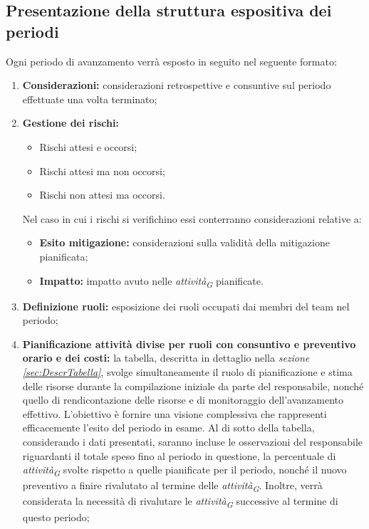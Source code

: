 \subsection{Presentazione della struttura espositiva dei periodi}
Ogni periodo di avanzamento verrà esposto in seguito nel seguente formato:
\begin{enumerate}
    \item \textbf{Considerazioni:} considerazioni retrospettive e consuntive sul periodo effettuate una volta terminato;

    \pagebreak
    
    \item \textbf{Gestione dei rischi:}
            \begin{itemize}
                \item Rischi attesi e occorsi;
                \item Rischi attesi ma non occorsi;
                \item Rischi non attesi ma occorsi.
            \end{itemize}
        Nel caso in cui i rischi si verifichino essi conterranno considerazioni relative a:
        \begin{itemize}
            \item \textbf{Esito mitigazione:} considerazioni sulla validità della mitigazione pianificata;
            \item \textbf{Impatto:} impatto avuto nelle \textit{attività}\textsubscript{\textit{G}} pianificate.
        \end{itemize}
    \item \textbf{Definizione ruoli:} esposizione dei ruoli occupati dai membri del team nel periodo;
    \item \textbf{Pianificazione attività divise per ruoli con consuntivo e preventivo orario e dei costi:}
    la tabella, descritta in dettaglio nella \textit{sezione \ref{sec:DescrTabella}}, svolge simultaneamente il ruolo di pianificazione e stima delle risorse durante la compilazione iniziale da parte del responsabile, nonché quello di rendicontazione delle risorse e di monitoraggio dell'avanzamento effettivo. L'obiettivo è fornire una visione complessiva che rappresenti efficacemente l'esito del periodo in esame.
    Al di sotto della tabella, considerando i dati presentati, saranno incluse le osservazioni del responsabile riguardanti il totale speso fino al periodo in questione, la percentuale di \textit{attività}\textsubscript{\textit{G}} svolte rispetto a quelle pianificate per il periodo, nonché il nuovo preventivo a finire rivalutato al termine delle \textit{attività}\textsubscript{\textit{G}}. Inoltre, verrà considerata la necessità di rivalutare le \textit{attività}\textsubscript{\textit{G}} successive al termine di questo periodo;

\end{enumerate}
